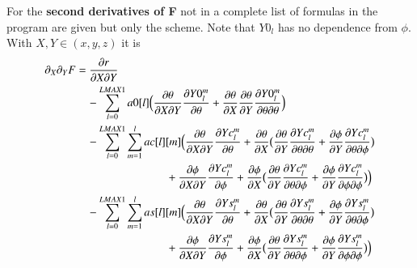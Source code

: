 \documentclass[11pt,a4paper,twoside]{article}
\begin{document}
For the \textbf{second derivatives of F} not in a complete list 
of formulas in the program are given but only the 
scheme. Note that $Y0_l$ has no dependence from $\phi$. With
$X,Y \in (x,y,z)$ it is
\begin{align}
  \partial_X \partial_Y F &= \frac {\partial r}{\partial X \partial Y} \notag\\
  &\quad -\sum_{l=0}^{LMAX1} a0[l] 
      \Big( \frac {\partial \theta}{\partial X \partial Y}
            \frac {\partial Y0_l^m} {\partial \theta}
           +\frac {\partial \theta} {\partial X }
            \frac {\partial \theta} {\partial Y }
            \frac {\partial Y0_l^m} {\partial \theta \partial \theta} \Big) \notag \\
  &\quad -\sum_{l=0}^{LMAX1}\sum_{m=1}^{l} ac[l][m] 
      \Big( \frac {\partial \theta}{\partial X \partial Y}
            \frac {\partial Yc_l^m} {\partial \theta}
           +\frac {\partial \theta} {\partial X}
              \big(\frac {\partial \theta} {\partial Y}
                    \frac {\partial Yc_l^m} {\partial \theta \partial \theta}
                   +\frac {\partial \phi} {\partial Y}
                    \frac {\partial Yc_l^m} {\partial \theta \partial \phi} \big)
                    \notag\\
  &\qquad \qquad \qquad \qquad
           +\frac {\partial \phi}  {\partial X \partial Y}
            \frac {\partial Yc_l^m} {\partial \phi}  
           +\frac {\partial \phi}  {\partial X}
           \big(\frac {\partial \theta}  {\partial Y}
                \frac {\partial Yc_l^m} {\partial \theta \partial \phi}
               +\frac {\partial \phi}  {\partial Y}
                \frac {\partial Yc_l^m} {\partial \phi \partial \phi} \big)
      \Big) \notag \\
  &\quad -\sum_{l=0}^{LMAX1}\sum_{m=1}^{l} as[l][m] 
      \Big( \frac {\partial \theta}{\partial X \partial Y}
            \frac {\partial Ys_l^m} {\partial \theta}
           +\frac {\partial \theta} {\partial X}
              \big(\frac {\partial \theta} {\partial Y}
                    \frac {\partial Ys_l^m} {\partial \theta \partial \theta}
                   +\frac {\partial \phi} {\partial Y}
                    \frac {\partial Ys_l^m} {\partial \theta \partial \phi} \big)
                    \notag\\
  &\qquad \qquad \qquad \qquad
           +\frac {\partial \phi}  {\partial X \partial Y}
            \frac {\partial Ys_l^m} {\partial \phi}  
           +\frac {\partial \phi}  {\partial X}
           \big(\frac {\partial \theta}  {\partial Y}
                \frac {\partial Ys_l^m} {\partial \theta \partial \phi}
               +\frac {\partial \phi}  {\partial Y}
                \frac {\partial Ys_l^m} {\partial \phi \partial \phi} \big)
      \Big)
\end{align} 
\end{document}
